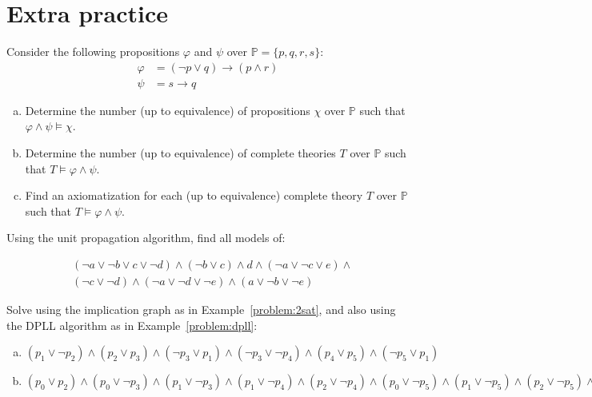     
\section*{Extra practice}
    

\begin{problem}

    Consider the following propositions $\varphi$ and $\psi$ over $\mathbb P=\{p, q, r, s\}$:
    \begin{align*}
        \varphi &= (\neg p \vee  q)\to(p\wedge r)\\
        \psi &= s\to q
    \end{align*}
    \begin{enumerate}[(a)]
        \item Determine the number (up to equivalence) of propositions $\chi$ over $\mathbb P$ such that $\varphi\wedge\psi\models\chi$.
        \item Determine the number (up to equivalence) of complete theories $T$ over $\mathbb P$ such that $T\models\varphi\wedge\psi$.
        \item Find an axiomatization for each (up to equivalence) complete theory $T$ over $\mathbb P$ such that $T\models\varphi\wedge\psi$.
    \end{enumerate}

\end{problem}


\begin{problem} 
    
    Using the unit propagation algorithm, find all models of:

    \begin{align*}
    &(\neg a \vee \neg b \vee c \vee \neg d)\wedge(\neg b \vee c)\wedge d \wedge (\neg a \vee \neg c \vee e)\wedge \\
    &(\neg c \vee \neg d)\wedge(\neg a \vee \neg d \vee \neg e)\wedge(a\vee \neg b \vee\neg e)
    \end{align*}

\end{problem}

    
\begin{problem} 
    
    Solve using the implication graph as in Example~\ref{problem:2sat}, and also using the DPLL algorithm as in Example~\ref{problem:dpll}:
    \begin{enumerate}[(a)]
        \item $(p_1\vee \neg p_2)\wedge (p_2\vee p_3)\wedge (\neg p_3\vee p_1)\wedge (\neg p_3\vee \neg p_4)\wedge (p_4\vee p_5)\wedge (\neg p_5\vee p_1)$
        \item $(p_0 \vee  p_2) \wedge  (p_0 \vee  \neg p_3) \wedge  (p_1 \vee  \neg p_3) 
        \wedge  (p_1 \vee  \neg p_4) \wedge  (p_2 \vee  \neg p_4) 
        \wedge  (p_0 \vee  \neg p_5)
        \wedge 
        (p_1 \vee  \neg p_5) \wedge  (p_2 \vee  \neg p_5) \wedge  (\neg p_1 \vee  \neg p_6) \wedge  (p_4 \vee  p_6) \wedge  (p_5 \vee  p_6) \wedge  p_1\wedge \neg p_7$
    \end{enumerate}

\end{problem}


